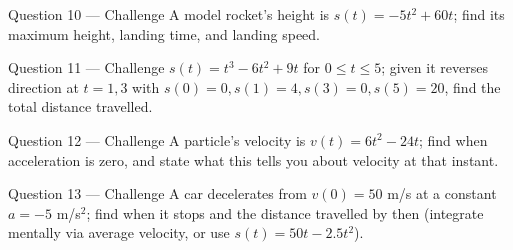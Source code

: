 \documentclass[11pt]{article}
\begin{document}
\begin{qbox}{Question 10 --- Challenge}
A model rocket's height is $s(t)=-5t^2+60t$; find its maximum height, landing time, and landing speed.\workspace{3.4cm}
\end{qbox}

\begin{qbox}{Question 11 --- Challenge}
$s(t)=t^3-6t^2+9t$ for $0\leq t\leq5$; given it reverses direction at $t=1,3$ with $s(0)=0,s(1)=4,s(3)=0,s(5)=20$, find the total distance travelled.\workspace{3.2cm}
\end{qbox}

\begin{qbox}{Question 12 --- Challenge}
A particle's velocity is $v(t)=6t^2-24t$; find when acceleration is zero, and state what this tells you about velocity at that instant.\workspace{3.2cm}
\end{qbox}

\begin{qbox}{Question 13 --- Challenge}
A car decelerates from $v(0)=50$ m/s at a constant $a=-5$ m/s$^2$; find when it stops and the distance travelled by then (integrate mentally via average velocity, or use $s(t)=50t-2.5t^2$).\workspace{3.2cm}
\end{qbox}

\clearpage
{}
\end{document}
